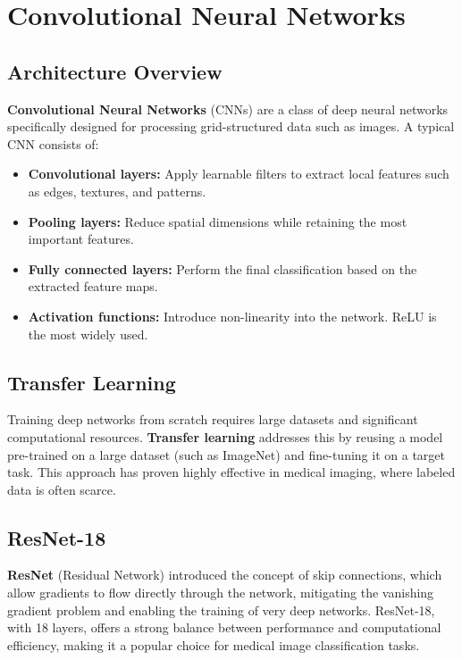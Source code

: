 \documentclass[12pt]{report}
\begin{document}
\section{Convolutional Neural Networks}

\subsection{Architecture Overview}
\textbf{Convolutional Neural Networks} (CNNs) are a class of deep neural networks
specifically designed for processing grid-structured data such as images.
A typical CNN consists of:

\begin{itemize}
    \item \textbf{Convolutional layers:} Apply learnable filters to extract
    local features such as edges, textures, and patterns.
    \item \textbf{Pooling layers:} Reduce spatial dimensions while retaining
    the most important features.
    \item \textbf{Fully connected layers:} Perform the final classification
    based on the extracted feature maps.
    \item \textbf{Activation functions:} Introduce non-linearity into the
    network. ReLU is the most widely used.
\end{itemize}

\subsection{Transfer Learning}
Training deep networks from scratch requires large datasets and significant
computational resources. \textbf{Transfer learning} addresses this by reusing a
model pre-trained on a large dataset (such as ImageNet) and fine-tuning
it on a target task. This approach has proven highly effective in medical
imaging, where labeled data is often scarce.

\subsection{ResNet-18}
\textbf{ResNet} (Residual Network) introduced the concept of skip connections,
which allow gradients to flow directly through the network, mitigating
the vanishing gradient problem and enabling the training of very deep
networks. ResNet-18, with 18 layers, offers a strong balance between
performance and computational efficiency, making it a popular choice for
medical image classification tasks.
\end{document}
